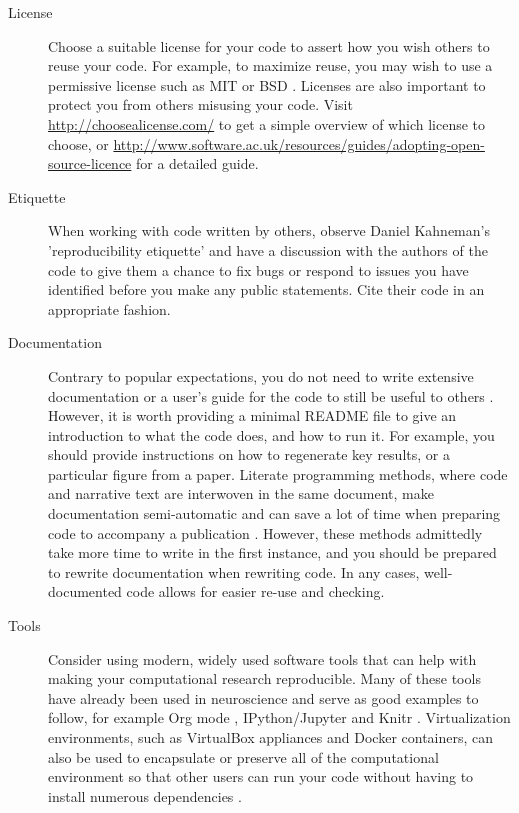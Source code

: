 \documentclass[11pt]{article}
\begin{document}
\begin{description}
\item [License] Choose a suitable license for your code to assert how
  you wish others to reuse your code.  For example, to maximize reuse,
  you may wish to use a permissive license such as MIT or BSD
  \cite{stodden2009enabling}.  Licenses are also important to protect you from
  others misusing your code.  Visit \url{http://choosealicense.com/}
  to get a simple overview of which license to choose, or 
  \url{http://www.software.ac.uk/resources/guides/adopting-open-source-licence}
  for a detailed guide.

\item [Etiquette] When working with code written by others, observe
  Daniel Kahneman's 'reproducibility etiquette'\cite{Kahneman2014} and
  have a discussion with the authors of the code to give them a chance
  to fix bugs or respond to issues you have identified before you make
  any public statements.  Cite their code in an appropriate fashion.


\item [Documentation] Contrary to popular expectations, you do not
  need to write extensive documentation or a user's guide for the code
  to still be useful to others \cite{Barnes2010-iv}.  However, it is
  worth providing a minimal README file to give an introduction to
  what the code does, and how to run it.  For example, you should
  provide instructions on how to regenerate key results, or a
  particular figure from a paper. Literate programming methods, where
  code and narrative text are interwoven in the same document, make
  documentation semi-automatic and can save a lot of time when
  preparing code to accompany a publication \cite{schulte2012multi,
    gentleman2012statistical}. However, these methods admittedly take
  more time to write in the first instance, and you should be prepared
  to rewrite documentation when rewriting code.  In any cases,
  well-documented code allows for easier re-use and checking.

\item [Tools] Consider using modern, widely used software tools that
  can help with making your computational research reproducible.  Many
  of these tools have already been used in neuroscience and serve as
  good examples to follow, for example Org mode \cite{Delescluse2011},
  IPython/Jupyter \cite{Stevens2013} and Knitr \cite{Eglen2014}.
  Virtualization environments, such as VirtualBox appliances and
  Docker containers, can also be used to encapsulate or preserve all
  of the computational environment so that other users can run your
  code without having to install numerous dependencies
  \cite{Boettiger2015}.



\end{description}
\end{document}

